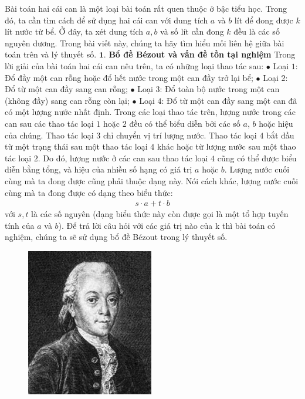 \begin{multicols}{2}
	Bài toán hai cái can là một loại bài toán rất quen thuộc ở bậc tiểu học. Trong đó, ta cần tìm cách để sử dụng hai cái can với dung tích $a$ và $b$ lít để đong được $k$ lít nước từ bể. Ở đây, ta xét dung tích $a, b$ và số lít cần đong $k$ đều là các số nguyên dương. Trong bài viết này, chúng ta hãy tìm hiểu mối liên hệ giữa bài toán trên và lý thuyết số.
	\vskip 0.1cm
	$\pmb{1.}$ \textbf{\color{hoccungpi}Bổ đề Bézout và vấn đề tồn tại nghiệm}
	\vskip 0.1cm
	Trong lời giải của bài toán hai cái can nêu trên, ta có những loại thao tác sau:
	\vskip 0.1cm
	$\bullet$ Loại $1$: Đổ đầy một can rỗng hoặc đổ hết nước trong một can đầy trở lại bể;
	\vskip 0.1cm
	$\bullet$ Loại $2$: Đổ từ một can đầy sang can rỗng;
	\vskip 0.1cm
	$\bullet$ Loại $3$: Đổ toàn bộ nước trong một can (không đầy) sang can rỗng còn lại;
	\vskip 0.1cm
	$\bullet$ Loại $4$: Đổ từ một can đầy sang một can đã có một lượng nước nhất định. 
	\vskip 0.1cm
	Trong các loại thao tác trên, lượng nước trong các can sau các thao tác loại $1$ hoặc $2$ đều có thể  biểu diễn bởi các số $a$, $b$ hoặc hiệu của chúng. Thao tác loại $3$ chỉ chuyển vị trí lượng nước. Thao tác loại $4$ bắt đầu từ một trạng thái sau một thao tác loại $4$ khác hoặc từ lượng nước sau một thao tác loại $2$. Do đó, lượng nước ở các can sau thao tác loại $4$ cũng có thể được biểu diễn bằng tổng, và hiệu của nhiều số hạng có giá trị $a$ hoặc $b$. Lượng nước cuối cùng mà ta đong được cũng phải thuộc dạng này.
	\vskip 0.1cm
	Nói cách khác, lượng nước cuối cùng mà ta đong được có dạng theo biểu thức: 
	\begin{align*}
		s\cdot a+ t\cdot b
	\end{align*}
	với $s,t$ là các số nguyên (dạng biểu thức này còn được gọi là một tổ hợp tuyến tính của $a$ và $b$). Để trả lời câu hỏi với các giá trị nào của k thì bài toán có nghiệm, chúng ta sẽ sử dụng bổ đề Bézout trong lý thuyết số.
	\begin{figure}[H]
		\centering
		\vspace*{-5pt}
		\captionsetup{labelformat= empty, justification=centering}
		\includegraphics[width=0.65\linewidth]{1}

\end{figure}
\end{multicols}

